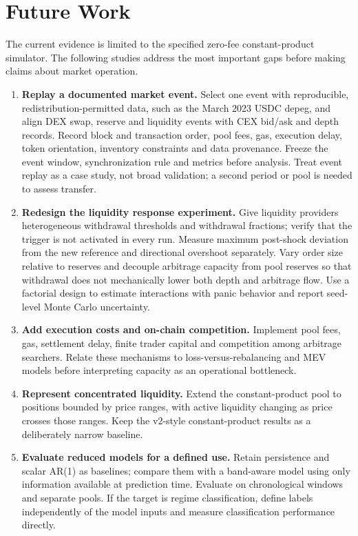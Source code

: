 \chapter{Future Work}
\label{cap:futuro}

The current evidence is limited to the specified zero-fee constant-product simulator. The following studies address the most important gaps before making claims about market operation.

\begin{enumerate}
  \item \textbf{Replay a documented market event.} Select one event with reproducible, redistribution-permitted data, such as the March 2023 USDC depeg, and align DEX swap, reserve and liquidity events with CEX bid/ask and depth records. Record block and transaction order, pool fees, gas, execution delay, token orientation, inventory constraints and data provenance. Freeze the event window, synchronization rule and metrics before analysis. Treat event replay as a case study, not broad validation; a second period or pool is needed to assess transfer.
  \item \textbf{Redesign the liquidity response experiment.} Give liquidity providers heterogeneous withdrawal thresholds and withdrawal fractions; verify that the trigger is not activated in every run. Measure maximum post-shock deviation from the new reference and directional overshoot separately. Vary order size relative to reserves and decouple arbitrage capacity from pool reserves so that withdrawal does not mechanically lower both depth and arbitrage flow. Use a factorial design to estimate interactions with panic behavior and report seed-level Monte Carlo uncertainty.
  \item \textbf{Add execution costs and on-chain competition.} Implement pool fees, gas, settlement delay, finite trader capital and competition among arbitrage searchers. Relate these mechanisms to loss-versus-rebalancing and MEV models before interpreting capacity as an operational bottleneck.
  \item \textbf{Represent concentrated liquidity.} Extend the constant-product pool to positions bounded by price ranges, with active liquidity changing as price crosses those ranges. Keep the v2-style constant-product results as a deliberately narrow baseline.
  \item \textbf{Evaluate reduced models for a defined use.} Retain persistence and scalar AR(1) as baselines; compare them with a band-aware model using only information available at prediction time. Evaluate on chronological windows and separate pools. If the target is regime classification, define labels independently of the model inputs and measure classification performance directly.

\end{enumerate}
